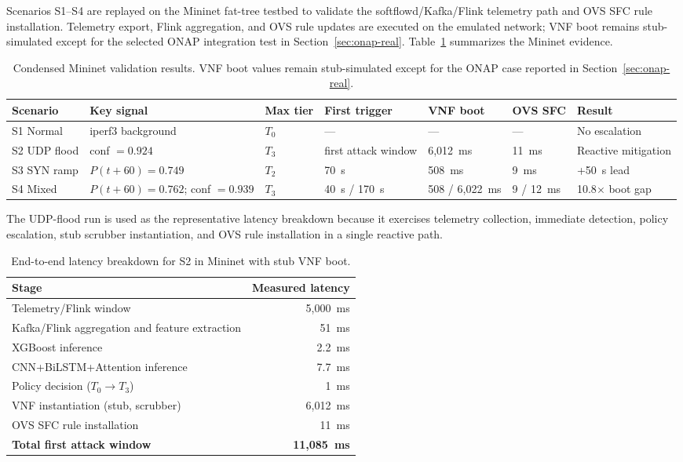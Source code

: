 Scenarios S1--S4 are replayed on the Mininet fat-tree testbed to validate the
softflowd/Kafka/Flink telemetry path and OVS SFC rule installation. Telemetry
export, Flink aggregation, and OVS rule updates are executed on the emulated
network; VNF boot remains stub-simulated except for the selected ONAP
integration test in Section~\ref{sec:onap-real}. Table~\ref{tab:mininet-validation-summary}
summarizes the Mininet evidence.

\begin{table}[H]
\centering
\small
\caption{Condensed Mininet validation results. VNF boot values remain
stub-simulated except for the ONAP case reported in Section~\ref{sec:onap-real}.}
\label{tab:mininet-validation-summary}
\begin{tabular}{@{}p{1.8cm}p{3.0cm}p{1.4cm}p{2.0cm}p{2.0cm}p{1.5cm}p{2.4cm}@{}}
\toprule
Scenario & Key signal & Max tier & First trigger & VNF boot & OVS SFC & Result \\
\midrule
S1 Normal & iperf3 background & $T_0$ & --- & --- & --- & No escalation \\
S2 UDP flood & conf $=0.924$ & $T_3$ & first attack window & 6{,}012~ms & 11~ms & Reactive mitigation \\
S3 SYN ramp & $P(t+60)=0.749$ & $T_2$ & 70~s & 508~ms & 9~ms & +50~s lead \\
S4 Mixed & $P(t+60)=0.762$; conf $=0.939$ & $T_3$ & 40~s / 170~s & 508 / 6{,}022~ms & 9 / 12~ms & 10.8$\times$ boot gap \\
\bottomrule
\end{tabular}
\end{table}

The UDP-flood run is used as the representative latency breakdown because it exercises telemetry collection, immediate detection, policy escalation, stub scrubber instantiation, and OVS rule installation in a single reactive path.

\begin{table}[H]
\centering
\small
\caption{End-to-end latency breakdown for S2 in Mininet with stub VNF boot.}
\label{tab:mininet-s2-latency}
\begin{tabular}{@{}lr@{}}
\toprule
Stage & Measured latency \\
\midrule
Telemetry/Flink window                & 5{,}000~ms \\
Kafka/Flink aggregation and feature extraction & 51~ms \\
XGBoost inference                     & 2.2~ms \\
CNN+BiLSTM+Attention inference        & 7.7~ms \\
Policy decision ($T_0 \to T_3$)       & 1~ms \\
VNF instantiation (stub, scrubber)    & 6{,}012~ms \\
OVS SFC rule installation             & 11~ms \\
\midrule
\textbf{Total first attack window}    & \textbf{11{,}085~ms} \\
\bottomrule
\end{tabular}
\end{table}

